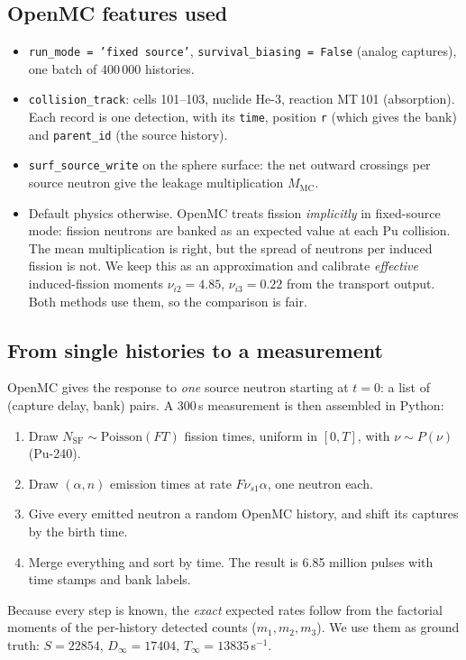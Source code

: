 \documentclass[11pt,a4paper]{article}
\newcommand{\Dinf}{D_\infty}
\newcommand{\Tinf}{T_\infty}
\begin{document}
\subsection{OpenMC features used}
\begin{itemize}
  \item \texttt{run\_mode = 'fixed source'}, \texttt{survival\_biasing = False} (analog captures), one batch of 400\,000 histories.
  \item \texttt{collision\_track}: cells 101--103, nuclide He-3, reaction MT\,101 (absorption). Each record is one detection, with its \texttt{time}, position \texttt{r} (which gives the bank) and \texttt{parent\_id} (the source history).
  \item \texttt{surf\_source\_write} on the sphere surface: the net outward crossings per source neutron give the leakage multiplication $M_{\text{MC}}$.
  \item Default physics otherwise. OpenMC treats fission \emph{implicitly} in fixed-source mode: fission neutrons are banked as an expected value at each Pu collision. The mean multiplication is right, but the spread of neutrons per induced fission is not. We keep this as an approximation and calibrate \emph{effective} induced-fission moments $\nu_{i2}=4.85$, $\nu_{i3}=0.22$ from the transport output. Both methods use them, so the comparison is fair.
\end{itemize}

\subsection{From single histories to a measurement}
OpenMC gives the response to \emph{one} source neutron starting at $t=0$: a list of
(capture delay, bank) pairs. A 300\,s measurement is then assembled in Python:
\begin{enumerate}
  \item Draw $N_{\text{SF}}\sim\text{Poisson}(FT)$ fission times, uniform in $[0,T]$, with $\nu\sim P(\nu)$ (Pu-240).
  \item Draw $(\alpha,n)$ emission times at rate $F\nu_{s1}\alpha$, one neutron each.
  \item Give every emitted neutron a random OpenMC history, and shift its captures by the birth time.
  \item Merge everything and sort by time. The result is 6.85 million pulses with time stamps and bank labels.
\end{enumerate}
Because every step is known, the \emph{exact} expected rates follow from the factorial
moments of the per-history detected counts ($m_1,m_2,m_3$). We use them as ground truth:
$S=22854$, $\Dinf=17404$, $\Tinf=13835$\,s$^{-1}$.
\end{document}
